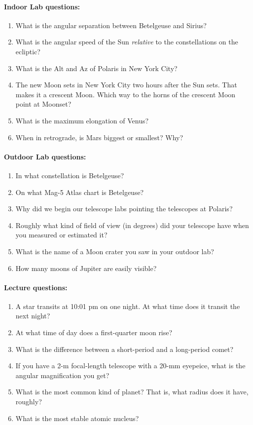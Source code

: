 \documentclass[12pt]{article}
\begin{document}
\paragraph{Indoor Lab questions:}
\begin{enumerate}[resume]
\item What is the angular separation between Betelgeuse and Sirius?
\item What is the angular speed of the Sun \emph{relative} to the
  constellations on the ecliptic?
\item What is the Alt and Az of Polaris in New York City?
\item The new Moon sets in New York City two hours after the Sun
  sets. That makes it a crescent Moon. Which way to the horns of the
  crescent Moon point at Moonset?
\item What is the maximum elongation of Venus?
\item When in retrograde, is Mars biggest or smallest? Why?
\end{enumerate}

\paragraph{Outdoor Lab questions:}
\begin{enumerate}[resume]
\item In what constellation is Betelgeuse?
\item On what Mag-5 Atlas chart is Betelgeuse?
\item Why did we begin our telescope labs pointing the telescopes at
  Polaris?
\item Roughly what kind of field of view (in degrees) did your
  telescope have when you measured or estimated it?
\item What is the name of a Moon crater you saw in your outdoor lab?
\item How many moons of Jupiter are easily visible?
\end{enumerate}

\paragraph{Lecture questions:}
\begin{enumerate}[resume]
\item A star transits at 10:01 pm on one night. At what time does it
  transit the next night?
\item At what time of day does a first-quarter moon rise?
\item What is the difference between a short-period and a long-period comet?
\item If you have a 2-m focal-length telescope with a 20-mm eyepeice,
  what is the angular magnification you get?
\item What is the most common kind of planet? That is, what radius
  does it have, roughly?
\item What is the most stable atomic nucleus?
\end{enumerate}
\end{document}
